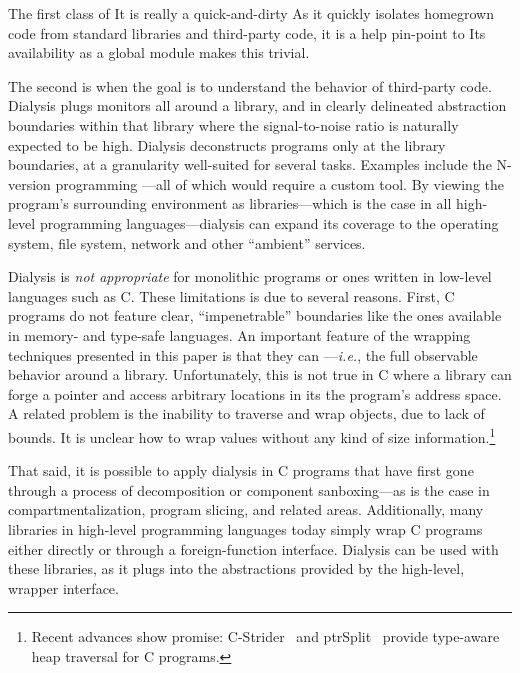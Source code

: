 \documentclass[letterpaper,twocolumn,10pt]{article}
\def\ie{{\em i.e.}, }
\newcommand{\sx}[1]{(\S\ref{#1})}
\newcommand{\sys}{{\scshape Lya}\xspace}
\begin{document}
The first class of  
It is really a quick-and-dirty 
As it quickly isolates homegrown code from standard libraries and third-party code, it is a help pin-point to 
Its availability as a global module makes this trivial.

The second is when the goal is to understand the behavior of third-party code.
Dialysis plugs monitors all around a library, and in clearly delineated abstraction boundaries within that library where the signal-to-noise ratio is naturally expected to be high.
Dialysis deconstructs programs only at the library boundaries, at a granularity well-suited for several tasks.
Examples include the 
N-version programming ---all of which would require a custom tool.
By viewing the program's surrounding environment as libraries---which is the case in all high-level programming languages---dialysis can expand its coverage to the operating system, file system, network and other ``ambient'' services.

Dialysis is \emph{not appropriate} for monolithic programs or ones written in low-level languages such as C.
These limitations is due to several reasons.
First, C programs do not feature clear, ``impenetrable'' boundaries like the ones available in memory- and type-safe languages.
An important feature of the wrapping techniques presented in this paper is that they can ---\ie the full observable behavior around a library.
Unfortunately, this is not true in C where a library can forge a pointer and access arbitrary locations in its the program's address space.
A related problem is the inability to traverse and wrap objects, due to lack of bounds.
It is unclear how to wrap values without any kind of size information.\footnote{
  Recent advances show promise: C-Strider~\cite{saur2016cstrider} and ptrSplit~\cite{ptrsplit:17} provide type-aware heap traversal for C programs.
}

That said, it is possible to apply dialysis in C programs that have first gone through a process of decomposition or component sanboxing---as is the case in compartmentalization, program slicing, and related areas.
Additionally, many libraries in high-level programming languages today simply wrap C programs either directly or through a foreign-function interface.
Dialysis can be used with these libraries, as it plugs into the abstractions provided by the high-level, wrapper interface.
\end{document}
